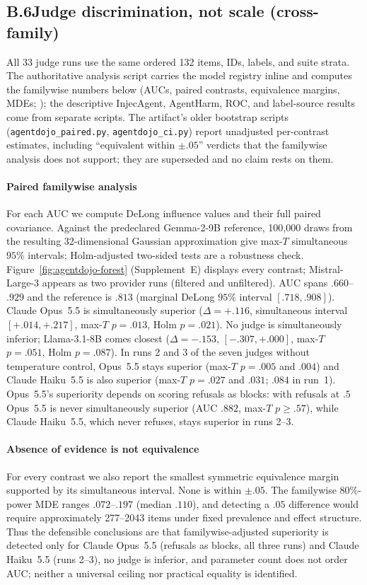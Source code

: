\subsection*{B.6\quad Judge discrimination, not scale (cross-family)}
All 33 judge runs use the same ordered 132 items, IDs, labels, and suite
strata. The authoritative analysis script carries the model registry inline and computes the
familywise numbers below (AUCs, paired contrasts, equivalence margins, MDEs;
); the
descriptive InjecAgent, AgentHarm, ROC, and label-source results come from separate
scripts. The artifact's older bootstrap scripts (\texttt{agentdojo\_paired.py},
\texttt{agentdojo\_ci.py}) report unadjusted per-contrast estimates, including
``equivalent within $\pm.05$'' verdicts that the familywise analysis does not support;
they are superseded and no claim rests on them.

\paragraph{Paired familywise analysis}
For each AUC we compute DeLong influence values and their full paired covariance.
Against the predeclared Gemma-2-9B reference, 100,000 draws from the resulting
32-dimensional Gaussian approximation give max-$T$ simultaneous $95\%$ intervals;
Holm-adjusted two-sided tests are a robustness check.
Figure~\ref{fig:agentdojo-forest} (Supplement~E) displays every contrast; Mistral-Large-3 appears as
two provider runs (filtered and unfiltered). AUC spans $.660$--$.929$ and the reference
is $.813$ (marginal DeLong $95\%$ interval $[.718,.908]$). Claude Opus~5.5 is
simultaneously superior ($\Delta=+.116$, simultaneous interval $[+.014,+.217]$, max-$T$
$p=.013$, Holm $p=.021$). No judge is simultaneously inferior; Llama-3.1-8B comes
closest ($\Delta=-.153$, $[-.307,+.000]$, max-$T$ $p=.051$, Holm $p=.087$). In runs 2
and 3 of the seven judges without temperature control, Opus~5.5 stays superior (max-$T$
$p=.005$ and $.004$) and Claude Haiku~5.5 is also superior (max-$T$ $p=.027$ and $.031$;
$.084$ in run~1). Opus~5.5's superiority depends on scoring refusals as blocks: with
refusals at $.5$ Opus~5.5 is never simultaneously superior (AUC $.882$, max-$T$ $p\ge.57$),
while Claude Haiku~5.5, which never refuses, stays superior in runs 2--3.


\paragraph{Absence of evidence is not equivalence}
For every contrast we also report the smallest symmetric equivalence margin
supported by its simultaneous interval. None is within $\pm.05$. The
familywise 80\%-power MDE ranges $.072$--$.197$ (median $.110$), and detecting
a $.05$ difference would require approximately 277--2043 items under
fixed prevalence and effect structure. Thus the defensible conclusions are
that familywise-adjusted superiority is detected only for Claude Opus~5.5 (refusals as
blocks, all three runs) and Claude Haiku~5.5 (runs 2--3), no judge is inferior, and
parameter count does not order AUC; neither a universal ceiling nor practical equality is
identified.

